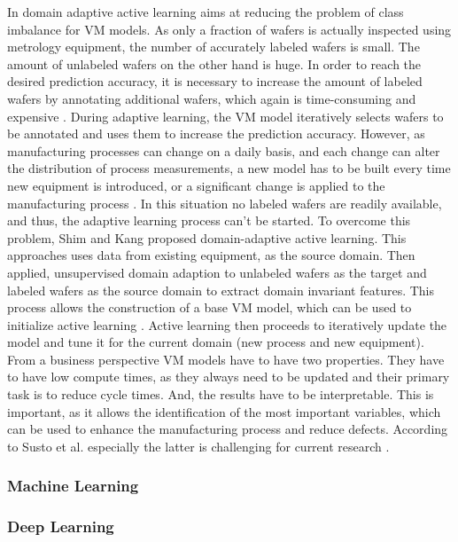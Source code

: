 \documentclass{Academic}
\begin{document}
    In domain adaptive active learning aims at reducing the problem of class imbalance for VM models. As only a fraction of wafers is actually inspected using metrology equipment, the number of accurately labeled wafers is small. The amount of unlabeled wafers on the other hand is huge. In order to reach the desired prediction accuracy, it is necessary to increase the amount of labeled wafers by annotating additional wafers, which again is time-consuming and expensive \cite{shim_domain-adaptive_2022}. During adaptive learning, the VM model iteratively selects wafers to be annotated and uses them to increase the prediction accuracy. However, as manufacturing processes can change on a daily basis, and each change can alter the distribution of process measurements, a new model has to be built every time new equipment is introduced, or a significant change is applied to the manufacturing process \cite{shim_domain-adaptive_2022}. In this situation no labeled wafers are readily available, and thus, the adaptive learning process can't be started. To overcome this problem, Shim and Kang \cite{shim_domain-adaptive_2022} proposed domain-adaptive active learning. This approaches uses data from existing equipment, as the source domain. Then applied, unsupervised domain adaption to unlabeled wafers as the target and labeled wafers as the source domain to extract domain invariant features. This process allows the construction of a base VM model, which can be used to initialize active learning \cite{shim_domain-adaptive_2022}. Active learning then proceeds to iteratively update the model and tune it for the current domain (new process and new equipment).
    From a business perspective VM models have to have two properties. They have to have low compute times, as they always need to be updated and their primary task is to reduce cycle times. And, the results have to be interpretable. This is important, as it allows the identification of the most important variables, which can be used to enhance the manufacturing process and reduce defects. According to Susto et al. especially the latter is challenging for current research \cite{susto_automatic_2012}.
    

    \subsubsection{Machine Learning}

    \subsubsection{Deep Learning}
\end{document}
